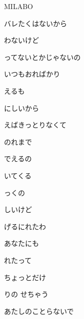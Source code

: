 \documentclass[a4paper,tate,twocolumn,12pt]{ltjtarticle}
\begin{document}
\thispagestyle{empty}

\begin{center}
{\LARGE MILABO}
\end{center}

\vspace{1em}

\begin{flushleft}

\noindent\begin{minipage}{\linewidth}
バレたくはないから

わないけど

ってないとかじゃないの

いつもおればかり

えるも

にしいから
\end{minipage}

\vspace{2em}

\noindent\begin{minipage}{\linewidth}
えばきっとりなくて

のれまで

でえるの

いてくる

っくの

しいけど

げるにれたわ
\end{minipage}

\vspace{2em}

\noindent\begin{minipage}{\linewidth}
あなたにも

れたって

ちょっとだけ 

りの せちゃう
\end{minipage}

\vspace{2em}

\noindent\begin{minipage}{\linewidth}
あたしのことらないで


\end{minipage}
\end{flushleft}
\end{document}
